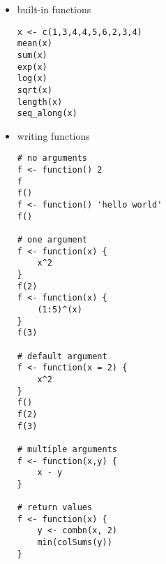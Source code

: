 \documentclass[a4paper,12pt]{article}
\begin{document}
\begin{itemize}

\item built-in functions

\begin{lstlisting}
x <- c(1,3,4,4,5,6,2,3,4)
mean(x)
sum(x)
exp(x)
log(x)
sqrt(x)
length(x)
seq_along(x)
\end{lstlisting}

\item writing functions


\begin{lstlisting}
# no arguments
f <- function() 2
f
f()
f <- function() 'hello world'
f()

# one argument
f <- function(x) {
    x^2
}
f(2)
f <- function(x) {
    (1:5)^(x)
}
f(3)

# default argument
f <- function(x = 2) {
    x^2
}
f()
f(2)
f(3)

# multiple arguments
f <- function(x,y) {
    x - y
}

# return values
f <- function(x) {
    y <- combn(x, 2)
    min(colSums(y))
}

\end{lstlisting}






\end{itemize}
\end{document}
